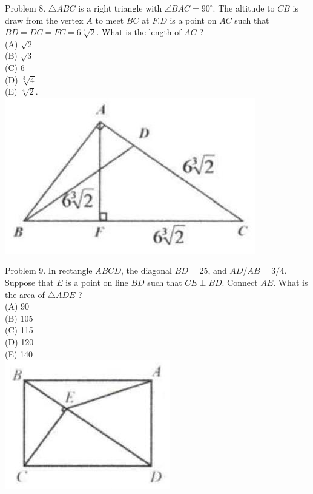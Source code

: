 \documentclass[10pt]{article}
\begin{document}
Problem 8. \(\triangle A B C\) is a right triangle with \(\angle B A C=90^{\circ}\). The altitude to \(C B\) is draw from the vertex \(A\) to meet \(B C\) at \(F . D\) is a point on \(A C\) such that \(B D=D C=F C=6 \sqrt[3]{2}\). What is the length of \(A C\) ?\\
(A) \(\sqrt{2}\)\\
(B) \(\sqrt{3}\)\\
(C) 6\\
(D) \(\sqrt[3]{4}\)\\
(E) \(\sqrt[4]{2}\).\\
\includegraphics[max width=\textwidth, center]{2025_04_17_97bc1f7e44d93c271a88g-089(2)}

Problem 9. In rectangle \(A B C D\), the diagonal \(B D=25\), and \(A D / A B=3 / 4\). Suppose that \(E\) is a point on line \(B D\) such that \(C E \perp B D\). Connect \(A E\). What is the area of \(\triangle A D E\) ?\\
(A) 90\\
(B) 105\\
(C) 115\\
(D) 120\\
(E) 140\\
\includegraphics[max width=\textwidth, center]{2025_04_17_97bc1f7e44d93c271a88g-089(1)}
\end{document}
